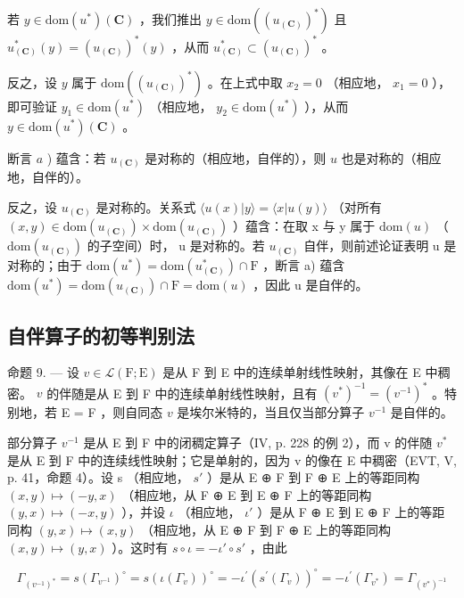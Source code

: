 若 \(y \in \text{dom}(u^*)(\mathbf{C})\) ，我们推出 \(y \in \text{dom}((u_{(\mathbf{C})})^*)\) 且 \(u_{(\mathbf{C})}^*(y) = (u_{(\mathbf{C})})^*(y)\) ，从而 \(u_{(\mathbf{C})}^* \subset (u_{(\mathbf{C})})^*\) 。

反之，设 \(y\) 属于 \(\text{dom}((u_{(\mathbf{C})})^*)\) 。在上式中取 \(x_2 = 0\) （相应地， \(x_1 = 0\) ），即可验证 \(y_1 \in \text{dom}(u^*)\) （相应地， \(y_2 \in \text{dom}(u^*)\) ），从而 \(y \in \text{dom}(u^*)(\mathbf{C})\) 。

断言 \(a\) ) 蕴含：若 \(u_{(\mathbf{C})}\) 是对称的（相应地，自伴的），则 \(u\) 也是对称的（相应地，自伴的）。

反之，设 \(u_{(\mathbf{C})}\) 是对称的。关系式 \(\langle u(x)|y\rangle = \langle x|u(y)\rangle\) （对所有 \((x,y) \in \mathrm{dom}(u_{(\mathbf{C})}) \times \mathrm{dom}(u_{(\mathbf{C})})\) ）蕴含：在取 x 与 y 属于 \(\mathrm{dom}(u)\) （ \(\mathrm{dom}(u_{(\mathbf{C})})\) 的子空间）时， u 是对称的。若 \(u_{(\mathbf{C})}\) 自伴，则前述论证表明 u 是对称的；由于 \(\mathrm{dom}(u^{*}) = \mathrm{dom}(u_{(\mathbf{C})}^{*}) \cap \mathrm{F}\) ，断言 a) 蕴含 \(\mathrm{dom}(u^{*}) = \mathrm{dom}(u_{(\mathbf{C})}) \cap \mathrm{F} = \mathrm{dom}(u)\) ，因此 u 是自伴的。

\subsection{自伴算子的初等判别法}

命题 9. --- 设 \(v \in \mathcal{L}(\mathrm{F};\mathrm{E})\) 是从 F 到 E 中的连续单射线性映射，其像在 E 中稠密。 \(v\) 的伴随是从 E 到 F 中的连续单射线性映射，且有 \((v^{*})^{-1} = (v^{-1})^{*}\) 。特别地，若 E = F ，则自同态 \(v\) 是埃尔米特的，当且仅当部分算子 \(v^{-1}\) 是自伴的。

部分算子 \(v^{-1}\) 是从 E 到 F 中的闭稠定算子（IV, p. 228 的例 2），而 v 的伴随 \(v^{*}\) 是从 E 到 F 中的连续线性映射；它是单射的，因为 v 的像在 E 中稠密（EVT, V, p. 41，命题 4）。设 s （相应地， \(s'\) ）是从 E ⊕ F 到 F ⊕ E 上的等距同构 \((x,y)\mapsto(-y,x)\) （相应地，从 F ⊕ E 到 E ⊕ F 上的等距同构 \((y,x)\mapsto(-x,y)\) ），并设 \(\iota\) （相应地， \(\iota'\) ）是从 F ⊕ E 到 E ⊕ F 上的等距同构 \((y,x)\mapsto(x,y)\) （相应地，从 E ⊕ F 到 F ⊕ E 上的等距同构 \((x,y)\mapsto(y,x)\) ）。这时有 \(s\circ\iota=-\iota'\circ s'\) ，由此

\[
\Gamma_ {(v ^ {- 1}) ^ {*}} = s \left(\Gamma_ {v ^ {- 1}}\right) ^ {\circ} = s \left(\iota \left(\Gamma_ {v}\right)\right) ^ {\circ} = - \iota^ {\prime} \left(s ^ {\prime} \left(\Gamma_ {v}\right)\right) ^ {\circ} = - \iota^ {\prime} \left(\Gamma_ {v ^ {*}}\right) = \Gamma_ {(v ^ {*}) ^ {- 1}}
\]

